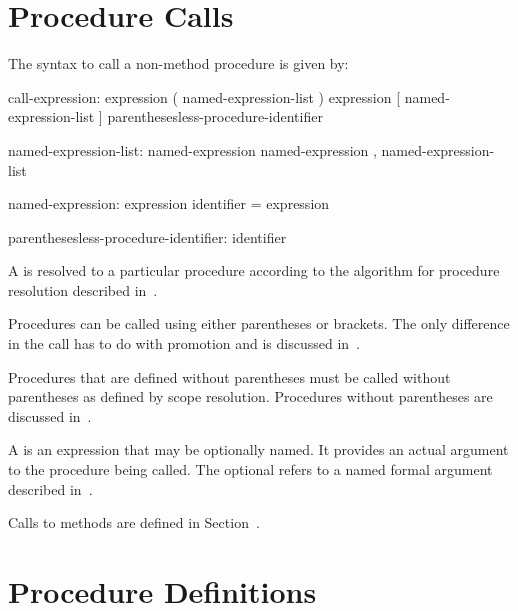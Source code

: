 \section{Procedure Calls}
\label{Procedure_Calls}

The syntax to call a non-method procedure is given by:
\begin{syntax}
call-expression:
  expression ( named-expression-list )
  expression [ named-expression-list ]
  parenthesesless-procedure-identifier

named-expression-list:
  named-expression
  named-expression , named-expression-list

named-expression:
  expression
  identifier = expression

parenthesesless-procedure-identifier:
  identifier
\end{syntax}


A  is resolved to a particular procedure
according to the algorithm for procedure resolution described
in~.

Procedures can be called using either parentheses or brackets.  The
only difference in the call has to do with promotion and is discussed
in~.

Procedures that are defined without parentheses must be called without
parentheses as defined by scope resolution.  Procedures without
parentheses are discussed in~.

A  is an expression that may be optionally
named.  It provides
an actual argument to the procedure being called.
The optional  refers to a named formal
argument described in~.

Calls to methods are defined in Section~.


\section{Procedure Definitions}
\label{Procedure_Definitions}
\label{Procedure_Definition_Aspects__Start}

